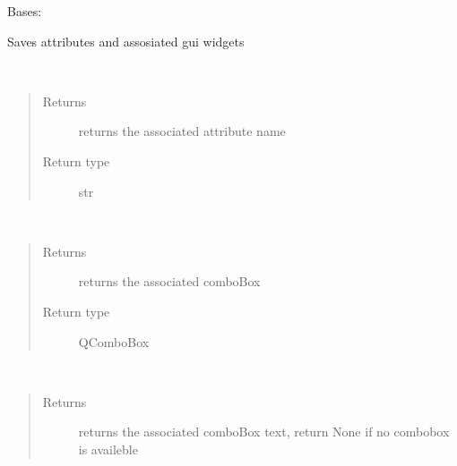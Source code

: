 \documentclass[letterpaper,10pt,english]{sphinxmanual}
\begin{document}
\begin{fulllineitems}
\label{\detokenize{code:AttributeForm.AttributeForm}}
Bases: 

Saves attributes and assosiated gui widgets

\begin{fulllineitems}
\label{\detokenize{code:AttributeForm.AttributeForm.getAttribute}}~\begin{quote}\begin{description}
\item[{Returns}] \leavevmode
returns the associated attribute name

\item[{Return type}] \leavevmode
str

\end{description}\end{quote}

\end{fulllineitems}


\begin{fulllineitems}
\label{\detokenize{code:AttributeForm.AttributeForm.getComboBox}}~\begin{quote}\begin{description}
\item[{Returns}] \leavevmode
returns the associated comboBox

\item[{Return type}] \leavevmode
QComboBox

\end{description}\end{quote}

\end{fulllineitems}


\begin{fulllineitems}
\label{\detokenize{code:AttributeForm.AttributeForm.getComboBoxCurrentText}}~\begin{quote}\begin{description}
\item[{Returns}] \leavevmode
returns the associated comboBox text, return None if no combobox is availeble


\end{description}
\end{quote}
\end{fulllineitems}
\end{fulllineitems}
\end{document}
